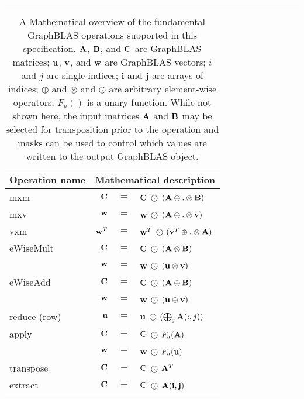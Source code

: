 \begin{table}[h]
\hrule
\begin{center}
\caption{A Mathematical overview of the fundamental GraphBLAS operations supported
in this specification. ${\bf A}$, ${\bf B}$, and ${\bf C}$ are GraphBLAS matrices; 
${\bf u}$, ${\bf v}$, and ${\bf w}$ are GraphBLAS vectors; $i$ and $j$ are single indices;
$\mathbf{i}$ and $\mathbf{j}$ are arrays of indices;
$\oplus$ and $\otimes$ and $\odot$ are arbitrary element-wise operators;  
$F_u()$ is a unary function.
While not shown here, the input 
matrices ${\bf A}$ and ${\bf B}$ may be selected for transposition prior to 
the operation and masks can be used to control which values are written to the output GraphBLAS object.}
\label{Tab:GraphBLASOps}
\begin{tabular}{l|rcl}
{\sf Operation name} & \multicolumn{3}{c}{Mathematical description}  \\
\hline
{\sf mxm}          & ${\bf C}$   & $=$ & ${\bf C}$   $\odot$ $({\bf A} \oplus.\otimes {\bf B})$ \\
{\sf mxv}          & ${\bf w}$   & $=$ & ${\bf w}$   $\odot$ $({\bf A} \oplus.\otimes {\bf v)}$ \\
{\sf vxm}          & ${\bf w}^T$ & $=$ & ${\bf w}^T$ $\odot$ $({\bf v}^T \oplus.\otimes {\bf A})$  \\
{\sf eWiseMult}    & ${\bf C}$   & $=$ & ${\bf C}$   $\odot$ $({\bf A} \otimes {\bf B})$ \\
                   & ${\bf w}$   & $=$ & ${\bf w}$   $\odot$ $({\bf u} \otimes {\bf v})$ \\
{\sf eWiseAdd}     & ${\bf C}$   & $=$ & ${\bf C}$   $\odot$ $({\bf A} \oplus {\bf B})$ \\
                   & ${\bf w}$   & $=$ & ${\bf w}$   $\odot$ $({\bf u} \oplus {\bf v})$ \\
{\sf reduce} (row) & ${\bf u}$   & $=$ & ${\bf u}$   $\odot$ $(\bigoplus_j{\bf A}(:,j))$  \\
{\sf apply}        & ${\bf C}$   & $=$ & ${\bf C}$   $\odot$ $F_u({\bf A})$ \\
                   & ${\bf w}$   & $=$ & ${\bf w}$   $\odot$ $F_u({\bf u})$ \\
{\sf transpose}    & ${\bf C}$   & $=$ & ${\bf C}$   $\odot$ ${\bf A}^T$ \\
{\sf extract}      & ${\bf C}$   & $=$ & ${\bf C}$   $\odot$ ${\bf A}({\bf i},{\bf j})$ \\

\end{tabular}
\end{center}
\end{table}
